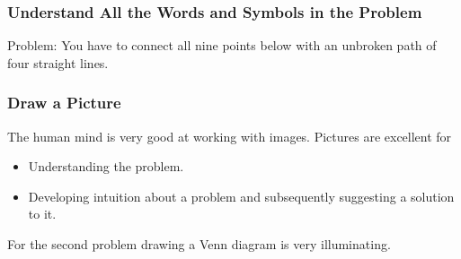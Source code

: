 \documentclass{beamer}
\begin{document}
\begin{frame}%
\frametitle{Understand All the Words and Symbols in the Problem}

\begin{mdframed}[style=exampledefault]
Problem: You have to connect all nine points below with an unbroken path of four straight lines.
\end{mdframed}



\end{frame}

\begin{frame}%
\frametitle{Draw a Picture}


The human mind is very good at working with images.
Pictures are excellent for
\begin{itemize}
\item<2-> Understanding the problem.

\item<2-> Developing intuition about a problem and subsequently suggesting a solution to it.

\end{itemize}

\vspace{0.4cm}
For the second problem drawing a Venn diagram is very illuminating.
\vspace{-0.3cm}

\end{frame}
\end{document}
